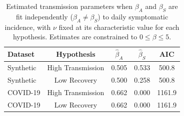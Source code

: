 \begin{table}[!ht]
\centering
\caption{Estimated transmission parameters when $\beta_A$ and $\beta_S$ are fit independently ($\beta_A\ne\beta_S$) to daily symptomatic incidence, with $\nu$ fixed at its characteristic value for each hypothesis. Estimates are constrained to $0 \le \beta \le 5$.}
\label{tab:betaAB}
\begin{tabular}{lcccc}
\toprule
Dataset & Hypothesis & $\hat{\beta}_A$ & $\hat{\beta}_S$ & AIC \\
\midrule
Synthetic & High Transmission & 0.505 & 0.533 & 500.8 \\
Synthetic & Low Recovery & 0.500 & 0.258 & 500.8 \\
COVID-19 & High Transmission & 0.662 & 0.000 & 1161.9 \\
COVID-19 & Low Recovery & 0.662 & 0.000 & 1161.9 \\
\bottomrule
\end{tabular}
\end{table}
